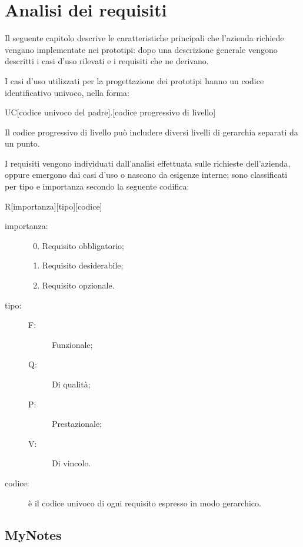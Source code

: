 \chapter{Analisi dei requisiti}\label{ch:requisiti}
Il seguente capitolo descrive le caratteristiche principali che l'azienda \myCompany richiede vengano implementate nei prototipi: dopo una descrizione generale vengono descritti i casi d'uso rilevati e i requisiti che ne derivano.

I casi d'uso utilizzati per la progettazione dei prototipi hanno un codice identificativo univoco, nella forma:
\begin{center}
UC[codice univoco del padre].[codice progressivo di livello]
\end{center}
Il codice progressivo di livello può includere diversi livelli di gerarchia separati da un punto.

I requisiti vengono individuati dall'analisi effettuata sulle richieste dell'azienda, oppure emergono dai casi d'uso o nascono da esigenze interne; sono classificati per tipo e importanza secondo la seguente codifica:
\begin{center}
R[importanza][tipo][codice]
\end{center}

\begin{description}
\item[importanza:] \hfill 
	\begin{enumerate}
	\setcounter{enumi}{-1}
	\item Requisito obbligatorio;
	\item Requisito desiderabile;
	\item Requisito opzionale.
	\end{enumerate}
\item[tipo:] \hfill 
	\begin{description}
	\item[F:] Funzionale;
	\item[Q:] Di qualità;
	\item[P:] Prestazionale;
	\item[V:] Di vincolo.
	\end{description}
\item[codice:] è il codice univoco di ogni requisito espresso in modo gerarchico.
\end{description}

\section{MyNotes}
